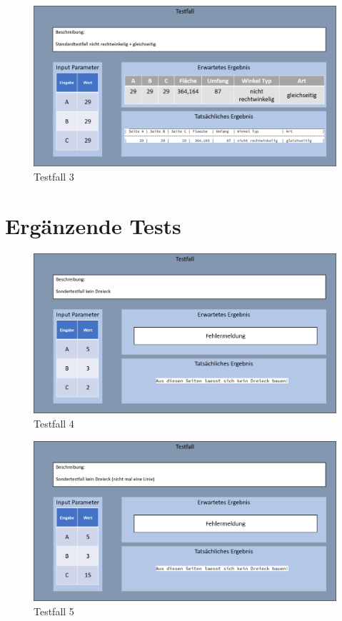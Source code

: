 \begin{figure}
    \centering
    \includegraphics[width=\linewidth]{images/Testfall3.png}
    \caption{Testfall 3}
\end{figure}

\section{Ergänzende Tests}\label{sec:ergänzende_tests}

\begin{figure}
    \centering
    \includegraphics[width=\linewidth]{images/Testfall4.png}
    \caption{Testfall 4}
\end{figure}

\begin{figure}
    \centering
    \includegraphics[width=\linewidth]{images/Testfall5.png}
    \caption{Testfall 5}
\end{figure}

